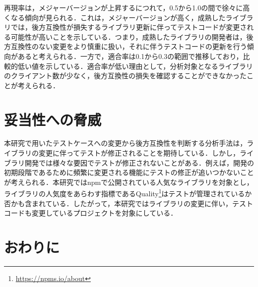 \documentclass[submit]{ipsj}
\begin{document}
再現率は，メジャーバージョンが上昇するにつれて，0.5から1.0の間で徐々に高くなる傾向が見られる．これは，メジャーバージョンが高く，成熟したライブラリでは，後方互換性が損失するライブラリ更新に伴ってテストコードが変更される可能性が高いことを示している．つまり，成熟したライブラリの開発者は，後方互換性のない変更をより慎重に扱い，それに伴うテストコードの更新を行う傾向があると考えられる．一方で，適合率は0.1から0.3の範囲で推移しており，比較的低い値を示している．適合率が低い理由として，分析対象となるライブラリのクライアント数が少なく，後方互換性の損失を確認することができなかったことが考えられる．

\section{妥当性への脅威}\label{sec:validity}


本研究で用いたテストケースへの変更から後方互換性を判断する分析手法は，ライブラリの変更に伴ってテストが修正されることを期待している．しかし，ライブラリ開発では様々な要因でテストが修正されないことがある．例えば，開発の初期段階であるために頻繁に変更される機能にテストの修正が追いつかないことが考えられる．本研究ではnpmで公開されている人気なライブラリを対象とし，ライブラリの人気度をあらわす指標であるQuality\footnote{\url{https://npms.io/about}}はテストが管理されているか否かも含まれている．したがって，本研究ではライブラリの変更に伴い，テストコードも変更しているプロジェクトを対象にしている．

\section{おわりに}
\label{sec:conclusion}
\end{document}
